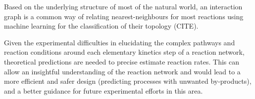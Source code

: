 Based on the underlying structure of most of the natural world,
an interaction graph is a common way of relating
nearest-neighbours for most reactions using machine learning
for the classification of their topology (CITE).

Given the experimental difficulties in elucidating the complex pathways and reaction conditions around each elementary kinetics step of a reaction network,
theoretical predictions are needed to precise estimate reaction rates.
This can allow an insightful understanding of the reaction network and would lead to a more efficient and safer design (predicting processes with unwanted by-products),
and a better guidance for future experimental efforts in this area.

